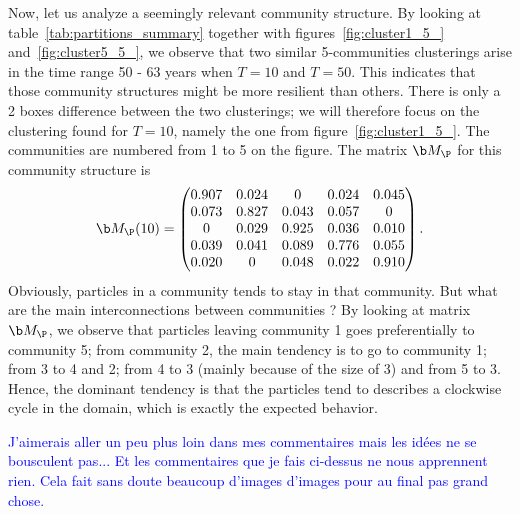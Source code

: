 Now, let us analyze a seemingly relevant community structure. By looking at table~\ref{tab:partitions_summary} together with figures~\ref{fig:cluster1_5_} and~\ref{fig:cluster5_5_}, we observe that two similar 5-communities clusterings arise in the time range 50 - 63 years when $T = 10$ and $T = 50$. This indicates that those community structures might be more resilient than others. There is only a 2 boxes difference between the two clusterings; we will therefore focus on the clustering found for $T = 10$, namely the one from figure~\ref{fig:cluster1_5_}. The communities are numbered from 1 to 5 on the figure. The matrix $\b M_{\P}$ for this community structure is
\begin{equation}
	\b M_{\P}(10) = 
	\begin{pmatrix}
	0.907 & 0.024 &     0 & 0.024 & 0.045\\
    0.073 & 0.827 & 0.043 & 0.057 & 0\\
        0 & 0.029 & 0.925 & 0.036 & 0.010\\
    0.039 & 0.041 & 0.089 & 0.776 & 0.055\\
    0.020 &     0 & 0.048 & 0.022 & 0.910\\
	\end{pmatrix}.
\end{equation}
Obviously, particles in a community tends to stay in that community. But what are the main interconnections between communities ? By looking at matrix $\b M_{\P}$, we observe that particles leaving community 1 goes preferentially to community 5; from community 2, the main tendency is to go to community 1; from 3 to 4 and 2; from 4 to 3 (mainly because of the size of 3) and from 5 to 3. Hence, the dominant tendency is that the particles tend to describes a clockwise cycle in the domain, which is exactly the expected behavior. 

\textcolor{blue}{J'aimerais aller un peu plus loin dans mes commentaires mais les idées ne se bousculent pas... Et les commentaires que je fais ci-dessus ne nous apprennent rien. Cela fait sans doute beaucoup d'images d'images pour au final pas grand chose.}

